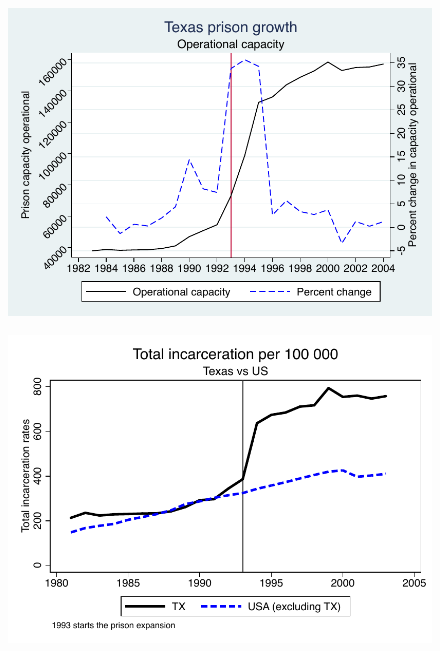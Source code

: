 \documentclass{beamer}
\begin{document}
\begin{frame}[shrink=30,plain]
\begin{figure}
\includegraphics{./lecture_includes/capacity_operational_texas.pdf}
\end{figure}
\end{frame}



\begin{frame}[shrink=30,plain]

\begin{figure}
\includegraphics{./lecture_includes/total_incarceration.pdf}
\end{figure}
\end{frame}
\end{document}
